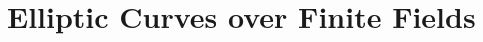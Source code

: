 \documentclass[../notes.tex]{subfiles}
\begin{document}
\section{Elliptic Curves over Finite Fields}
\end{document}
